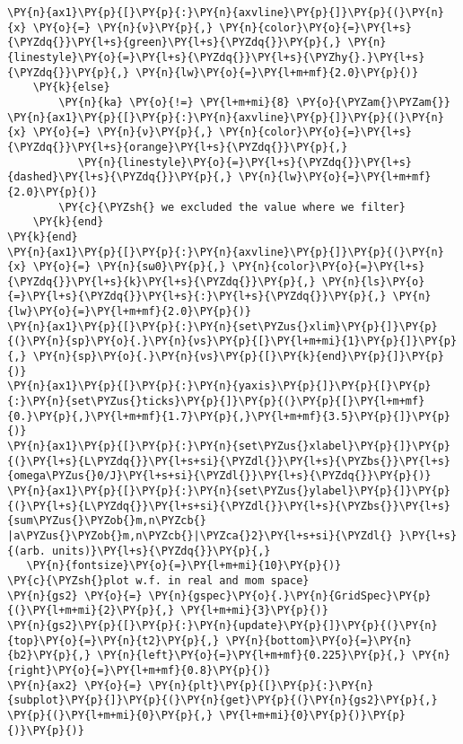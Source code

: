 \begin{Verbatim}[commandchars=\\\{\}]
        \PY{n}{ax1}\PY{p}{[}\PY{p}{:}\PY{n}{axvline}\PY{p}{]}\PY{p}{(}\PY{n}{x} \PY{o}{=} \PY{n}{ν}\PY{p}{,} \PY{n}{color}\PY{o}{=}\PY{l+s}{\PYZdq{}}\PY{l+s}{green}\PY{l+s}{\PYZdq{}}\PY{p}{,} \PY{n}{linestyle}\PY{o}{=}\PY{l+s}{\PYZdq{}}\PY{l+s}{\PYZhy{}.}\PY{l+s}{\PYZdq{}}\PY{p}{,} \PY{n}{lw}\PY{o}{=}\PY{l+m+mf}{2.0}\PY{p}{)}
    \PY{k}{else}
        \PY{n}{ka} \PY{o}{!=} \PY{l+m+mi}{8} \PY{o}{\PYZam{}\PYZam{}} \PY{n}{ax1}\PY{p}{[}\PY{p}{:}\PY{n}{axvline}\PY{p}{]}\PY{p}{(}\PY{n}{x} \PY{o}{=} \PY{n}{ν}\PY{p}{,} \PY{n}{color}\PY{o}{=}\PY{l+s}{\PYZdq{}}\PY{l+s}{orange}\PY{l+s}{\PYZdq{}}\PY{p}{,}
           \PY{n}{linestyle}\PY{o}{=}\PY{l+s}{\PYZdq{}}\PY{l+s}{dashed}\PY{l+s}{\PYZdq{}}\PY{p}{,} \PY{n}{lw}\PY{o}{=}\PY{l+m+mf}{2.0}\PY{p}{)}
        \PY{c}{\PYZsh{} we excluded the value where we filter}
    \PY{k}{end}
\PY{k}{end}
\PY{n}{ax1}\PY{p}{[}\PY{p}{:}\PY{n}{axvline}\PY{p}{]}\PY{p}{(}\PY{n}{x} \PY{o}{=} \PY{n}{sω0}\PY{p}{,} \PY{n}{color}\PY{o}{=}\PY{l+s}{\PYZdq{}}\PY{l+s}{k}\PY{l+s}{\PYZdq{}}\PY{p}{,} \PY{n}{ls}\PY{o}{=}\PY{l+s}{\PYZdq{}}\PY{l+s}{:}\PY{l+s}{\PYZdq{}}\PY{p}{,} \PY{n}{lw}\PY{o}{=}\PY{l+m+mf}{2.0}\PY{p}{)}
\PY{n}{ax1}\PY{p}{[}\PY{p}{:}\PY{n}{set\PYZus{}xlim}\PY{p}{]}\PY{p}{(}\PY{n}{sp}\PY{o}{.}\PY{n}{νs}\PY{p}{[}\PY{l+m+mi}{1}\PY{p}{]}\PY{p}{,} \PY{n}{sp}\PY{o}{.}\PY{n}{νs}\PY{p}{[}\PY{k}{end}\PY{p}{]}\PY{p}{)}
\PY{n}{ax1}\PY{p}{[}\PY{p}{:}\PY{n}{yaxis}\PY{p}{]}\PY{p}{[}\PY{p}{:}\PY{n}{set\PYZus{}ticks}\PY{p}{]}\PY{p}{(}\PY{p}{[}\PY{l+m+mf}{0.}\PY{p}{,}\PY{l+m+mf}{1.7}\PY{p}{,}\PY{l+m+mf}{3.5}\PY{p}{]}\PY{p}{)}
\PY{n}{ax1}\PY{p}{[}\PY{p}{:}\PY{n}{set\PYZus{}xlabel}\PY{p}{]}\PY{p}{(}\PY{l+s}{L\PYZdq{}}\PY{l+s+si}{\PYZdl{}}\PY{l+s}{\PYZbs{}}\PY{l+s}{omega\PYZus{}0/J}\PY{l+s+si}{\PYZdl{}}\PY{l+s}{\PYZdq{}}\PY{p}{)}
\PY{n}{ax1}\PY{p}{[}\PY{p}{:}\PY{n}{set\PYZus{}ylabel}\PY{p}{]}\PY{p}{(}\PY{l+s}{L\PYZdq{}}\PY{l+s+si}{\PYZdl{}}\PY{l+s}{\PYZbs{}}\PY{l+s}{sum\PYZus{}\PYZob{}m,n\PYZcb{} |a\PYZus{}\PYZob{}m,n\PYZcb{}|\PYZca{}2}\PY{l+s+si}{\PYZdl{} }\PY{l+s}{(arb. units)}\PY{l+s}{\PYZdq{}}\PY{p}{,}
   \PY{n}{fontsize}\PY{o}{=}\PY{l+m+mi}{10}\PY{p}{)}
\PY{c}{\PYZsh{}plot w.f. in real and mom space}
\PY{n}{gs2} \PY{o}{=} \PY{n}{gspec}\PY{o}{.}\PY{n}{GridSpec}\PY{p}{(}\PY{l+m+mi}{2}\PY{p}{,} \PY{l+m+mi}{3}\PY{p}{)}
\PY{n}{gs2}\PY{p}{[}\PY{p}{:}\PY{n}{update}\PY{p}{]}\PY{p}{(}\PY{n}{top}\PY{o}{=}\PY{n}{t2}\PY{p}{,} \PY{n}{bottom}\PY{o}{=}\PY{n}{b2}\PY{p}{,} \PY{n}{left}\PY{o}{=}\PY{l+m+mf}{0.225}\PY{p}{,} \PY{n}{right}\PY{o}{=}\PY{l+m+mf}{0.8}\PY{p}{)}
\PY{n}{ax2} \PY{o}{=} \PY{n}{plt}\PY{p}{[}\PY{p}{:}\PY{n}{subplot}\PY{p}{]}\PY{p}{(}\PY{n}{get}\PY{p}{(}\PY{n}{gs2}\PY{p}{,} \PY{p}{(}\PY{l+m+mi}{0}\PY{p}{,} \PY{l+m+mi}{0}\PY{p}{)}\PY{p}{)}\PY{p}{)}

\end{Verbatim}
